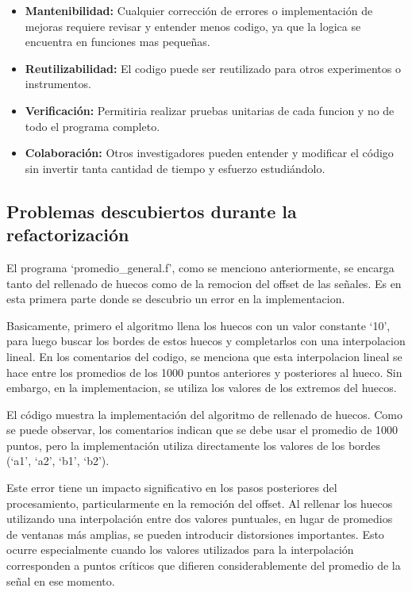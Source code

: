 \documentclass[12pt,a4paper]{article}
\begin{document}
\begin{itemize}

\item \textbf{Mantenibilidad:} Cualquier corrección de errores o implementación de mejoras requiere revisar y entender menos codigo, ya que la logica se encuentra en funciones mas pequeñas.

\item \textbf{Reutilizabilidad:} El codigo puede ser reutilizado para otros experimentos o instrumentos.

\item \textbf{Verificación:} Permitiria realizar pruebas unitarias de cada funcion y no de todo el programa completo.

\item \textbf{Colaboración:} Otros investigadores pueden entender y modificar el código sin
invertir tanta cantidad de tiempo y esfuerzo estudiándolo.

\end{itemize}

\subsection{Problemas descubiertos durante la refactorización}

El programa `promedio\_general.f', como se menciono anteriormente, se encarga tanto del rellenado de huecos como de la remocion del offset de las señales. Es en esta primera parte donde se descubrio un error en la implementacion.

Basicamente, primero el algoritmo llena los huecos con un valor constante `10', para luego buscar los bordes de estos huecos y completarlos con una interpolacion lineal. En los comentarios del codigo, se menciona que esta interpolacion lineal se hace entre los promedios de los 1000 puntos anteriores y posteriores al hueco. Sin embargo, en la implementacion, se utiliza los valores de los extremos del huecos.

El código  muestra la implementación del algoritmo de rellenado de huecos. Como se puede observar, los comentarios indican que se debe usar el promedio de 1000 puntos, pero la implementación utiliza directamente los valores de los bordes (`a1', `a2', `b1', `b2').

Este error tiene un impacto significativo en los pasos posteriores del procesamiento, particularmente en la remoción del offset. Al rellenar los huecos utilizando una interpolación entre dos valores puntuales, en lugar de promedios de ventanas más amplias, se pueden introducir distorsiones importantes. Esto ocurre especialmente cuando los valores utilizados para la interpolación corresponden a puntos críticos que difieren considerablemente del promedio de la señal en ese momento.
\end{document}
